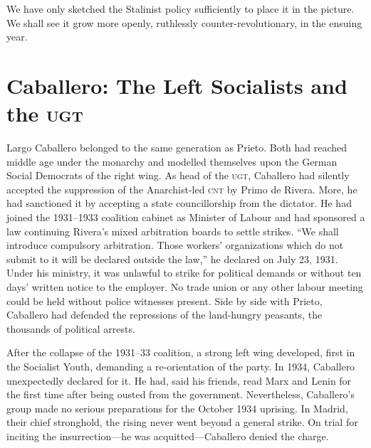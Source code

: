 We have only sketched the Stalinist policy sufficiently to place it in the picture. We shall see it grow more openly, ruthlessly counter-revolutionary, in the ensuing year.

\section{Caballero: The Left Socialists and the \textsc{ugt}}

Largo Caballero belonged to the same generation as Prieto. Both had reached middle age under the monarchy and modelled themselves upon the German Social Democrats of the right wing. As head of the \textsc{ugt}, Caballero had silently accepted the suppression of the Anarchist-led \textsc{cnt} by Primo de Rivera. More, he had sanctioned it by accepting a state councillorship from the dictator. He had joined the 1931–1933 coalition cabinet as Minister of Labour and had sponsored a law continuing Rivera’s mixed arbitration boards to settle strikes. ``We shall introduce compulsory arbitration. Those workers’ organizations which do not submit to it will be declared outside the law,'' he declared on July 23, 1931. Under his ministry, it was unlawful to strike for political demands or without ten days’ written notice to the employer. No trade union or any other labour meeting could be held without police witnesses present. Side by side with Prieto, Caballero had defended the repressions of the land-hungry peasants, the thousands of political arrests.

After the collapse of the 1931–33 coalition, a strong left wing developed, first in the Socialist Youth, demanding a re-orientation of the party. In 1934, Caballero unexpectedly declared for it. He had, said his friends, read Marx and Lenin for the first time after being ousted from the government. Nevertheless, Caballero’s group made no serious preparations for the October 1934 uprising. In Madrid, their chief stronghold, the rising never went beyond a general strike. On trial for inciting the insurrection---he was acquitted---Caballero denied the charge.


